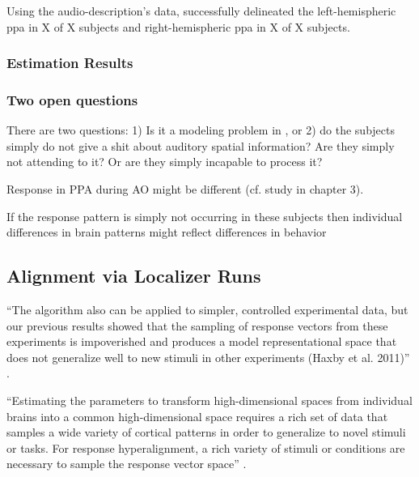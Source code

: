 Using the audio-description's data, \citet{haeusler2022processing} successfully
delineated the left-hemispheric \ac{ppa} in X of X subjects and
right-hemispheric \ac{ppa} in X of X subjects.



\subsubsection{Estimation Results}


\subsubsection{Two open questions}

%
There are two questions:
%
1) Is it a modeling problem in \citet{haeusler2022processing}, or
%
2) do the subjects simply do not give a shit about auditory spatial
information? Are they simply not attending to it? Or are they simply incapable
to process it?

%
Response in PPA during AO might be different (cf. study in chapter 3).

%
If the response pattern is simply not occurring in these subjects then
individual differences in brain patterns might reflect differences in behavior




\subsection{Alignment via Localizer Runs}

%
``The algorithm also can be applied to simpler, controlled experimental data,
but our previous results showed that the sampling of response vectors from these
experiments is impoverished and produces a model representational space that
does not generalize well to new stimuli in other experiments (Haxby et al.
2011)'' \citep{guntupalli2016model}.

%
``Estimating the parameters to transform high-dimensional spaces from individual
brains into a common high-dimensional space requires a rich set of data that
samples a wide variety of cortical patterns in order to generalize to novel
stimuli or tasks.
%
For response hyperalignment, a rich variety of stimuli or conditions are
necessary to sample the response vector space'' \citep{haxby2020hyperalignment}.

